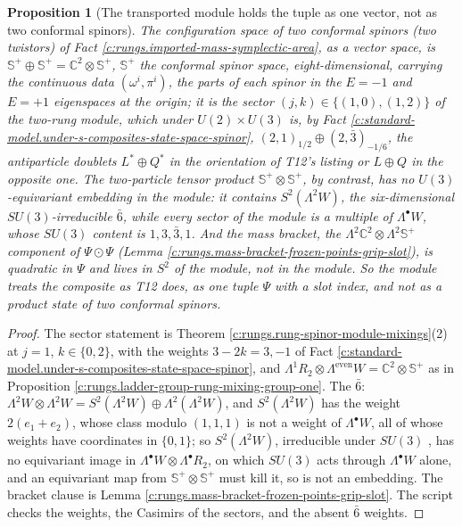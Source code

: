 \documentclass[11pt]{article}
\newtheorem{proposition}[theorem]{Proposition}
\theoremstyle{definition}
\theoremstyle{plain}
\providecommand{\C}{}\renewcommand{\C}{\mathbb{C}}
\providecommand{\CS}{}\renewcommand{\CS}{{\mathbb{S}^{+}}}
\begin{document}
\begin{proposition}[The transported module holds the tuple as one vector, not as two conformal spinors]\label{c:rungs.transported-module-holds-tuple-one-vector}
The configuration space of two conformal spinors (two twistors) of Fact \ref{c:rungs.imported-mass-symplectic-area}, as a vector space, is $\CS \oplus \CS = \C^{2} \otimes \CS$, $\CS$ the conformal spinor space, eight-dimensional, carrying the continuous data $(\omega^{i}, \pi^{i})$, the parts of each spinor in the $E = -1$ and $E = +1$ eigenspaces at the origin; it is the sector $(j, k) \in \{(1,0), (1,2)\}$ of the two-rung module, which under $U(2) \times U(3)$ is, by Fact \ref{c:standard-model.under-s-composites-state-space-spinor}, $(2,1)_{1/2} \oplus (2,\bar{3})_{-1/6}$, the antiparticle doublets $L^{*} \oplus Q^{*}$ in the orientation of T12's listing or $L \oplus Q$ in the opposite one. The two-particle tensor product $\CS \otimes \CS$, by contrast, has no $U(3)$-equivariant embedding in the module: it contains $S^{2}(\Lambda^{2}W)$, the six-dimensional $SU(3)$-irreducible $\bar{6}$, while every sector of the module is a multiple of $\Lambda^{\bullet}W$, whose $SU(3)$ content is $1, 3, \bar{3}, 1$. And the mass bracket, the $\Lambda^{2}\C^{2} \otimes \Lambda^{2}\CS$ component of $\Psi \odot \Psi$ (Lemma \ref{c:rungs.mass-bracket-frozen-points-grip-slot}), is quadratic in $\Psi$ and lives in $S^{2}$ of the module, not in the module. So the module treats the composite as T12 does, as one tuple $\Psi$ with a slot index, and not as a product state of two conformal spinors.
\end{proposition}
\begin{proof}
The sector statement is Theorem \ref{c:rungs.rung-spinor-module-mixings}(2) at $j = 1$, $k \in \{0, 2\}$, with the weights $3 - 2k = 3, -1$ of Fact \ref{c:standard-model.under-s-composites-state-space-spinor}, and $\Lambda^{1}R_{2} \otimes \Lambda^{\mathrm{even}}W = \C^{2} \otimes \CS$ as in Proposition \ref{c:rungs.ladder-group-rung-mixing-group-one}. The $\bar{6}$: $\Lambda^{2}W \otimes \Lambda^{2}W = S^{2}(\Lambda^{2}W) \oplus \Lambda^{2}(\Lambda^{2}W)$, and $S^{2}(\Lambda^{2}W)$ has the weight $2(e_{1} + e_{2})$, whose class modulo $(1,1,1)$ is not a weight of $\Lambda^{\bullet}W$, all of whose weights have coordinates in $\{0, 1\}$; so $S^{2}(\Lambda^{2}W)$, irreducible under $SU(3)$ \cite[\S 15.3]{FultonHarris1991}, has no equivariant image in $\Lambda^{\bullet}W \otimes \Lambda^{\bullet}R_{2}$, on which $SU(3)$ acts through $\Lambda^{\bullet}W$ alone, and an equivariant map from $\CS \otimes \CS$ must kill it, so is not an embedding. The bracket clause is Lemma \ref{c:rungs.mass-bracket-frozen-points-grip-slot}. The script checks the weights, the Casimirs of the sectors, and the absent $\bar{6}$ weights.

\end{proof}
\end{document}
